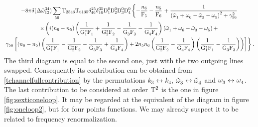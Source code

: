 \begin{multline}
    -8\pi\delta(\Delta{\tilde{\omega}}^{34}_{12})\sum_{56}\mathrm{T}_{2546}\mathrm{T}_{6135}\delta^{25}_{46}
    \delta^{35}_{16}\mathrm{D}_1^0\mathrm{D}_2^0\mathrm{D}_3^0\mathrm{D}_4^0 \left\{ -\frac{n_6}{\mathrm{F}_5}-\frac{n_5}{\mathrm{F}_6}\right. +
    \frac{1}{\left( \tilde{\omega}^{}_1 + \omega^{}_6 - \tilde{\omega}^{}_3 - \omega^{}_5\right)^2 + \gamma^2_{56}}\\
    \times \left(
    i(n_6-n_5)\left(\dfrac{1}{\mathrm{G}_1^*\mathrm{F}_1^{}}+\dfrac{1}{\mathrm{G}_2^*\mathrm{F}_2^{}}-\dfrac{1}{\mathrm{G}_3^{}\mathrm{F}_3^{}}
    -\dfrac{1}{\mathrm{G}_4^{}\mathrm{F}_4^{}}\right)\left(\tilde{\omega}^{}_1 + \omega^{}_6 - \tilde{\omega}^{}_3 - \omega^{}_5\right) + 
    \right.\\
    \left.\left.
    \gamma_{56}\left[(n_6-n_5 )\left(\dfrac{1}{\mathrm{G}_1^*\mathrm{F}_1^{}}-\dfrac{1}{\mathrm{G}_2^*\mathrm{F}_2^{}}-\dfrac{1}{\mathrm{G}_3^{}\mathrm{F}_3^{}}
    +\dfrac{1}{\mathrm{G}_4^{}\mathrm{F}_4^{}}\right) + 2n_5n_6 \left(\dfrac{1}{\mathrm{G}_2^*\mathrm{F}_2^{}}-\dfrac{1}{\mathrm{G}_4^{}\mathrm{F}_4^{}}\right)\left(\dfrac{1}{\mathrm{G}_1^*\mathrm{F}_1^{}}-\dfrac{1}{\mathrm{G}_3^{}\mathrm{F}_3^{}}
    \right)\right)
    \right]\right\}.
    \label{tchannelfullcontribution}
\end{multline}    
The third diagram is equal to the second one, just with the two outgoing lines swapped. Consequently its contribution can be obtained from 
\eqref{tchannelfullcontribution} by the permutations $k_3 \leftrightarrow k_4$, $\tilde{\omega}^{}_3 \leftrightarrow\tilde{\omega}^{}_4$ and $\omega^{}_3 \leftrightarrow\omega^{}_4$.\\

The last contribution to be considered at order $\mathrm{T}^2$ is the one in figure \ref{fig:sexticoneloop}. It may be regarded at the equivalent of the diagram in figure 
\ref{fig:oneloop2}, but for four points functions. We may already suspect it to be related to frequency renormalization.\\

